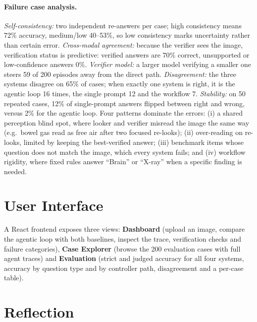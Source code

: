 \paragraph{Failure case analysis.}
\emph{Self-consistency:} two independent re-answers per case; high consistency means 72\% accuracy, medium/low
40--53\%, so low consistency marks uncertainty rather than certain error.
\emph{Cross-modal agreement:} because the verifier sees the image, verification status is predictive: verified
answers are 70\% correct, unsupported or low-confidence answers 0\%.
\emph{Verifier model:} a larger model verifying a smaller one steers 59 of 200 episodes away from the direct path.
\emph{Disagreement:} the three systems disagree on 65\% of cases; when exactly one system is right, it is the agentic
loop 16 times, the single prompt 12 and the workflow 7.
\emph{Stability:} on 50 repeated cases, 12\% of single-prompt answers flipped between right and wrong, versus 2\% for
the agentic loop.
Four patterns dominate the errors: (i) a shared perception blind spot, where looker and verifier misread the image the
same way (e.g.\ bowel gas read as free air after two focused re-looks); (ii) over-reading on re-looks, limited by
keeping the best-verified answer; (iii) benchmark items whose question does not match the image, which every system
fails; and (iv) workflow rigidity, where fixed rules answer ``Brain'' or ``X-ray'' when a specific finding is needed.

\section{User Interface}\label{sec:ui}
A React frontend exposes three views: \textbf{Dashboard} (upload an image, compare the agentic loop with both
baselines, inspect the trace, verification checks and failure categories), \textbf{Case Explorer} (browse the 200
evaluation cases with full agent traces) and \textbf{Evaluation} (strict and judged accuracy for all four systems,
accuracy by question type and by controller path, disagreement and a per-case table).

\section{Reflection}
